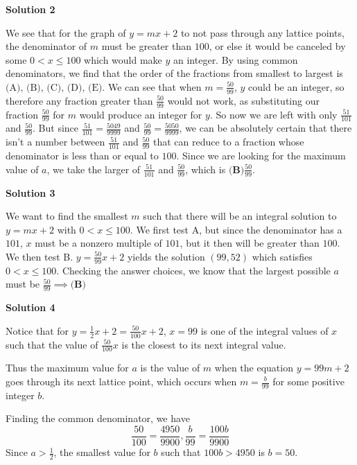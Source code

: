 \begin{enumerate}
 



\textbf{Solution 2}

We see that for the graph of $y=mx+2$ to not pass through any lattice points, the denominator of $m$ must be greater than $100$, or else it would be canceled by some $0<x\le100$ which would make $y$ an integer. By using common denominators, we find that the order of the fractions from smallest to largest is $\text{(A), (B), (C), (D), (E)}$. We can see that when $m=\frac{50}{99}$, $y$ could be an integer, so therefore any fraction greater than $\frac{50}{99}$ would not work, as substituting our fraction $\frac{50}{99}$ for $m$ would produce an integer for $y$. So now we are left with only $\frac{51}{101}$ and $\frac{50}{99}$. But since $\frac{51}{101}=\frac{5049}{9999}$ and $\frac{50}{99}=\frac{5050}{9999}$, we can be absolutely certain that there isn't a number between $\frac{51}{101}$ and $\frac{50}{99}$ that can reduce to a fraction whose denominator is less than or equal to $100$. Since we are looking for the maximum value of $a$, we take the larger of $\frac{51}{101}$ and $\frac{50}{99}$, which is $\boxed{\textbf{(B)}\frac{50}{99}}$.

 



\textbf{Solution 3}

We want to find the smallest $m$ such that there will be an integral solution to $y=mx+2$ with $0<x\le100$. We first test A, but since the denominator has a $101$, $x$ must be a nonzero multiple of $101$, but it then will be greater than $100$. We then test B. $y=\frac{50}{99}x+2$ yields the solution $(99,52)$ which satisfies $0<x\le100$. Checking the answer choices, we know that the largest possible $a$ must be $\frac{50}{99}\implies\boxed{\textbf{(B)}}$




\textbf{Solution 4}

Notice that for $y=\frac{1}{2}x+2=\frac{50}{100}x+2$, $x=99$ is one of the integral values of $x$ such that the value of $\frac{50}{100}x$ is the closest to its next integral value.

 
Thus the maximum value for $a$ is the value of $m$ when the equation $y=99m+2$ goes through its next lattice point, which occurs when $m=\frac{b}{99}$ for some positive integer $b$.

 
Finding the common denominator, we have 
 \[\frac{50}{100}=\frac{4950}{9900}, \frac{b}{99}=\frac{100b}{9900}\] Since $a>\frac{1}{2}$, the smallest value for $b$ such that $100b>4950$ is $b=50$. 


\end{enumerate}
